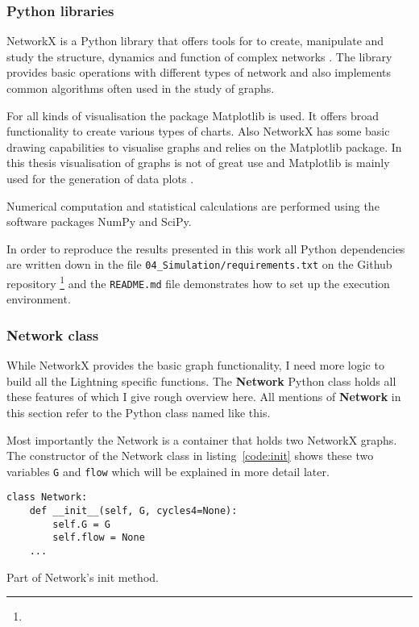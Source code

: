 \documentclass[final]{fhnwreport}       %
\begin{document}
\subsubsection{Python libraries}
NetworkX is a Python library that offers tools for to create, manipulate and study the structure, dynamics and function of complex networks \citep{al-taie_python_2017}. The library provides basic operations with different types of network and also implements common algorithms often used in the study of graphs.  

For all kinds of visualisation the package Matplotlib is used. It offers broad functionality to create various types of charts. Also NetworkX has some basic drawing capabilities to visualise graphs and relies on the Matplotlib package. In this thesis visualisation of graphs is not of great use and Matplotlib is mainly used for the generation of data plots \citep{al-taie_python_2017}.

Numerical computation and statistical calculations are performed using the software packages NumPy and SciPy. 

In order to reproduce the results presented in this work all Python dependencies are written down in the file \texttt{04\_Simulation/requirements.txt} on the Github repository \footnote{\github} and the \texttt{README.md} file demonstrates how to set up the execution environment.

\subsubsection{Network class}
While NetworkX provides the basic graph functionality, I need more logic to build all the Lightning specific functions. The \textbf{Network} Python class holds all these features of which I give rough overview here. All mentions of \textbf{Network} in this section refer to the Python class named like this.

Most importantly the Network is a container that holds two NetworkX graphs. The constructor of the Network class in listing~\ref{code:init} shows these two variables \texttt{G} and \texttt{flow} which will be explained in more detail later.

\begin{listing}[H]
  \begin{verbatim}
class Network:
    def __init__(self, G, cycles4=None):
        self.G = G
        self.flow = None
	...
  \end{verbatim}
  \caption{Part of Network's init method.}
  \label{code:init}
\end{listing}
\end{document}
